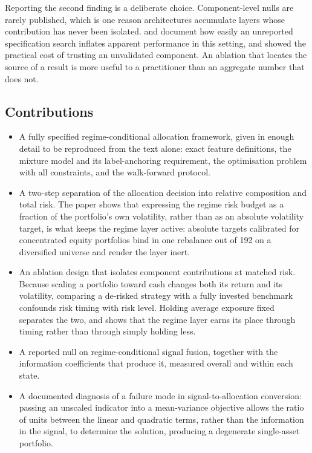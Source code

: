 Reporting the second finding is a deliberate choice. Component-level nulls are rarely
published, which is one reason architectures accumulate layers whose contribution has
never been isolated. \citet{harvey15} and \citet{valls26} document how easily an
unreported specification search inflates apparent performance in this setting, and
\citet{demiguel09} showed the practical cost of trusting an unvalidated component. An
ablation that locates the source of a result is more useful to a practitioner than an
aggregate number that does not.

\subsection{Contributions}

\begin{itemize}

\item A fully specified regime-conditional allocation framework, given in enough detail
to be reproduced from the text alone: exact feature definitions, the mixture model and
its label-anchoring requirement, the optimisation problem with all constraints, and the
walk-forward protocol.

\item A two-step separation of the allocation decision into relative composition and
total risk. The paper shows that expressing the regime risk budget as a fraction of the
portfolio's own volatility, rather than as an absolute volatility target, is what keeps
the regime layer active: absolute targets calibrated for concentrated equity portfolios
bind in one rebalance out of 192 on a diversified universe and render the layer inert.

\item An ablation design that isolates component contributions at matched risk. Because
scaling a portfolio toward cash changes both its return and its volatility, comparing a
de-risked strategy with a fully invested benchmark confounds risk timing with risk
level. Holding average exposure fixed separates the two, and shows that the regime
layer earns its place through timing rather than through simply holding less.

\item A reported null on regime-conditional signal fusion, together with the
information coefficients that produce it, measured overall and within each state.

\item A documented diagnosis of a failure mode in signal-to-allocation conversion:
passing an unscaled indicator into a mean-variance objective allows the ratio of units
between the linear and quadratic terms, rather than the information in the signal, to
determine the solution, producing a degenerate single-asset portfolio.

\end{itemize}

